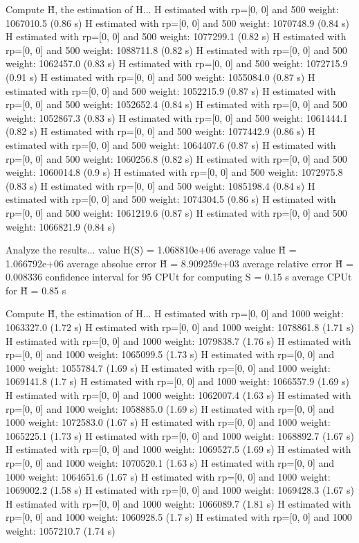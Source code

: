 Compute H̃, the estimation of H...
  H estimated with rp=[0, 0] and 500 weight:  1067010.5  (0.86 s)
  H estimated with rp=[0, 0] and 500 weight:  1070748.9  (0.84 s)
  H estimated with rp=[0, 0] and 500 weight:  1077299.1  (0.82 s)
  H estimated with rp=[0, 0] and 500 weight:  1088711.8  (0.82 s)
  H estimated with rp=[0, 0] and 500 weight:  1062457.0  (0.83 s)
  H estimated with rp=[0, 0] and 500 weight:  1072715.9  (0.91 s)
  H estimated with rp=[0, 0] and 500 weight:  1055084.0  (0.87 s)
  H estimated with rp=[0, 0] and 500 weight:  1052215.9  (0.87 s)
  H estimated with rp=[0, 0] and 500 weight:  1052652.4  (0.84 s)
  H estimated with rp=[0, 0] and 500 weight:  1052867.3  (0.83 s)
  H estimated with rp=[0, 0] and 500 weight:  1061444.1  (0.82 s)
  H estimated with rp=[0, 0] and 500 weight:  1077442.9  (0.86 s)
  H estimated with rp=[0, 0] and 500 weight:  1064407.6  (0.87 s)
  H estimated with rp=[0, 0] and 500 weight:  1060256.8  (0.82 s)
  H estimated with rp=[0, 0] and 500 weight:  1060014.8  (0.9 s)
  H estimated with rp=[0, 0] and 500 weight:  1072975.8  (0.83 s)
  H estimated with rp=[0, 0] and 500 weight:  1085198.4  (0.84 s)
  H estimated with rp=[0, 0] and 500 weight:  1074304.5  (0.86 s)
  H estimated with rp=[0, 0] and 500 weight:  1061219.6  (0.87 s)
  H estimated with rp=[0, 0] and 500 weight:  1066821.9  (0.84 s)

Analyze the results...
  value H(S)                  = 1.068810e+06 
  average value H̃             = 1.066792e+06 
  average absolue error H̃     = 8.909259e+03 
  average relative error H̃    = 0.008336 
  confidence interval for 95%
  CPUt for computing S         = 0.15 s
  average CPUt for H̃           = 0.85 s

Compute H̃, the estimation of H...
  H estimated with rp=[0, 0] and 1000 weight:  1063327.0  (1.72 s)
  H estimated with rp=[0, 0] and 1000 weight:  1078861.8  (1.71 s)
  H estimated with rp=[0, 0] and 1000 weight:  1079838.7  (1.76 s)
  H estimated with rp=[0, 0] and 1000 weight:  1065099.5  (1.73 s)
  H estimated with rp=[0, 0] and 1000 weight:  1055784.7  (1.69 s)
  H estimated with rp=[0, 0] and 1000 weight:  1069141.8  (1.7 s)
  H estimated with rp=[0, 0] and 1000 weight:  1066557.9  (1.69 s)
  H estimated with rp=[0, 0] and 1000 weight:  1062007.4  (1.63 s)
  H estimated with rp=[0, 0] and 1000 weight:  1058885.0  (1.69 s)
  H estimated with rp=[0, 0] and 1000 weight:  1072583.0  (1.67 s)
  H estimated with rp=[0, 0] and 1000 weight:  1065225.1  (1.73 s)
  H estimated with rp=[0, 0] and 1000 weight:  1068892.7  (1.67 s)
  H estimated with rp=[0, 0] and 1000 weight:  1069527.5  (1.69 s)
  H estimated with rp=[0, 0] and 1000 weight:  1070520.1  (1.63 s)
  H estimated with rp=[0, 0] and 1000 weight:  1064651.6  (1.67 s)
  H estimated with rp=[0, 0] and 1000 weight:  1069002.2  (1.58 s)
  H estimated with rp=[0, 0] and 1000 weight:  1069428.3  (1.67 s)
  H estimated with rp=[0, 0] and 1000 weight:  1066089.7  (1.81 s)
  H estimated with rp=[0, 0] and 1000 weight:  1060928.5  (1.7 s)
  H estimated with rp=[0, 0] and 1000 weight:  1057210.7  (1.74 s)

